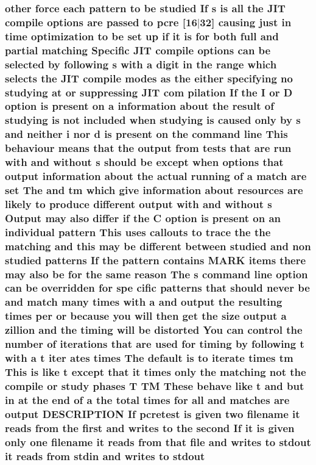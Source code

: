 \subsubsection[{\texorpdfstring{stdout}{stdout}}]{ other force each {\bf pattern} {\bf to} {\bf be} {\bf studied} If {\bf s} {\bf is} {\bf all} the J\+IT {\bf compile} {\bf options} {\bf are} passed {\bf to} {\bf pcre} \mbox{[}16$\vert$32\mbox{]} causing just {\bf in} {\bf time} optimization {\bf to} {\bf be} {\bf set} up {\bf if} {\bf it} {\bf is} for both full and {\bf partial} {\bf matching} Specific J\+IT {\bf compile} {\bf options} {\bf can} {\bf be} {\bf selected} by following {\bf s} {\bf with} {\bf a} digit {\bf in} the range {\bf which} selects the J\+IT {\bf compile} {\bf modes} {\bf as} the either {\bf specifying} no {\bf studying} at {\bf or} suppressing J\+IT com pilation If the {\bf I} {\bf or} {\bf D} {\bf option} {\bf is} {\bf present} {\bf on} {\bf a} information about the {\bf result} {\bf of} {\bf studying} {\bf is} {\bf not} {\bf included} when {\bf studying} {\bf is} caused only by {\bf s} and neither {\bf i} nor {\bf d} {\bf is} {\bf present} {\bf on} the {\bf command} {\bf line} This behaviour means that the {\bf output} {\bf from} {\bf tests} that {\bf are} {\bf run} {\bf with} and without {\bf s} should {\bf be} {\bf except} when {\bf options} that {\bf output} information about the actual running {\bf of} {\bf a} {\bf match} {\bf are} {\bf set} The and {\bf tm} {\bf which} give information about resources {\bf are} likely {\bf to} produce different {\bf output} {\bf with} and without {\bf s} Output may also differ {\bf if} the {\bf C} {\bf option} {\bf is} {\bf present} {\bf on} an individual {\bf pattern} This uses callouts {\bf to} trace the the {\bf matching} and {\bf this} may {\bf be} different between {\bf studied} and non {\bf studied} {\bf patterns} If the {\bf pattern} {\bf contains} M\+A\+RK items there may also {\bf be} for the same {\bf reason} The {\bf s} {\bf command} {\bf line} {\bf option} {\bf can} {\bf be} overridden for spe cific {\bf patterns} that should never {\bf be} and {\bf match} many {\bf times} {\bf with} {\bf a} and {\bf output} the resulting {\bf times} per {\bf or} because you will then get the {\bf size} {\bf output} {\bf a} zillion and the timing will {\bf be} distorted You {\bf can} control the {\bf number} {\bf of} iterations that {\bf are} {\bf used} for timing by following {\bf t} {\bf with} {\bf a} {\bf t} {\bf iter} ates {\bf times} The {\bf default} {\bf is} {\bf to} iterate {\bf times} {\bf tm} This {\bf is} like {\bf t} {\bf except} that {\bf it} {\bf times} only the {\bf matching} {\bf not} the {\bf compile} {\bf or} {\bf study} phases {\bf T} TM These behave like {\bf t} and but {\bf in} at the {\bf end} {\bf of} {\bf a} the total {\bf times} for {\bf all} and {\bf matches} {\bf are} {\bf output} D\+E\+S\+C\+R\+I\+P\+T\+I\+ON If {\bf pcretest} {\bf is} {\bf given} two {\bf filename} {\bf it} reads {\bf from} the {\bf first} and writes {\bf to} the {\bf second} If {\bf it} {\bf is} {\bf given} only one {\bf filename} {\bf it} reads {\bf from} that {\bf file} and writes {\bf to} stdout {\bf it} reads {\bf from} stdin and writes {\bf to} stdout}\hypertarget{pcretest_8txt_a23d7bb711442e83ff18e0effa4729bdf}{}\label{pcretest_8txt_a23d7bb711442e83ff18e0effa4729bdf}
